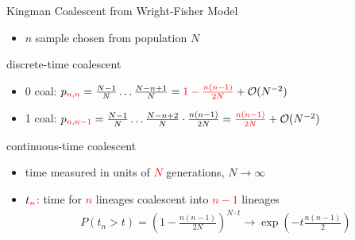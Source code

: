 \documentclass[handout]{beamer}
\begin{document}
\begin{frame}{Kingman Coalescent from Wright-Fisher Model}
\begin{itemize}
\item $n$ sample chosen from population $N$
\end{itemize}
\begin{block}{discrete-time coalescent}
\begin{itemize}
\item 0 coal: $p_{\textcolor{red}{n,n}}=\frac{N-1}{N}\ldots\frac{N-n+1}{N}=\textcolor{red}{1-\frac{n(n-1)}{2N}}+\mathcal{O}(N^{-2})$
\item 1 coal: $p_{\textcolor{red}{n,n-1}}=\frac{N-1}{N}\ldots\frac{N-n+2}{N}\cdot \frac{n(n-1)}{2N}=\textcolor{red}{\frac{n(n-1)}{2N}}+\mathcal{O}(N^{-2})$
\end{itemize}
\end{block}
\begin{block}{continuous-time coalescent}
\begin{itemize}
\item time measured in units of \textcolor{red}{$N$} generations, $N\rightarrow\infty$
\item $t_{\textcolor{red}{n}}$: time for \textcolor{red}{$n$} lineages coalescent into \textcolor{red}{$n-1$} lineages
\begin{align}P(t_{n}>t)=(1-\frac{n(n-1)}{2N})^{N\cdot t}\rightarrow\exp(-t\frac{n(n-1)}{2})\end{align}
\end{itemize}
\end{block}
\end{frame}
\end{document}
